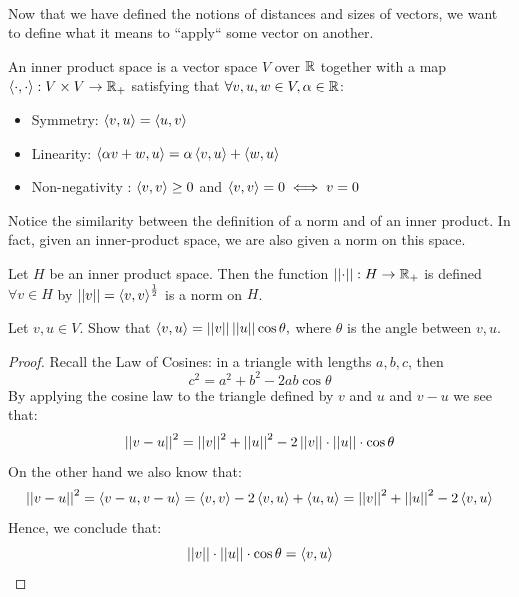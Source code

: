 ~\\
Now that we have defined the notions of distances and sizes of vectors, we want to define what it means to ``apply`` some vector on another.

\begin{definition} 
An inner product space is a vector space $V$ over $\mathbb{R}$ together with a map $\left\langle \cdot,\cdot\right\rangle:V\times V\rightarrow\mathbb{R}_+$ satisfying that $\forall v,u,w\in V, \alpha \in\mathbb{R}$:
\begin{itemize}
	\item Symmetry: $\left\langle v,u\right\rangle=\left\langle u,v\right\rangle$
	\item Linearity: $\left\langle \alpha v+w,u\right\rangle=\alpha \left\langle v,u\right\rangle + \left\langle w,u\right\rangle$
	\item Non-negativity : $\left\langle v,v\right\rangle\geq 0$  and $\left\langle v,v\right\rangle=0 \iff v=0$ 
\end{itemize}
\end{definition}

Notice the similarity between the definition of a norm and of an inner product. In fact, given an inner-product space, we are also given a norm on this space.

\begin{claim} Let $H$ be an inner product space. Then the function $\left|\left| \cdot\right|\right|:H\rightarrow \mathbb{R}_+$ is defined $\forall v\in H$ by $\left|\left| v\right|\right|=\left\langle v,v\right\rangle^{\frac{1}{2}}$ is a norm on $H$.
\end{claim}


\begin{exercise} 
Let $v,u\in V$. Show that  $\left\langle v,u\right\rangle=\left|\left| v\right|\right|\left|\left| u\right|\right|\cos\theta,$ where $\theta$ is the angle between $v,u$.
\end{exercise} 
\begin{proof}
Recall the Law of Cosines:  in a triangle with lengths $a,b,c$, then  $$c^2=a^2+b^2-2ab\cos\theta$$
By applying the cosine law to the triangle defined by $v$ and $u$ and $v-u$ we see that:
$$ \left|\left| v-u\right|\right|^2=\left|\left| v\right|\right|^2+\left|\left| u\right|\right|^2-2\left|\left| v\right|\right|\cdot\left|\left| u\right|\right|\cdot \cos \theta$$
On the other hand we also know that:
$$ \left|\left| v-u\right|\right|^2=\left\langle v-u,v-u\right\rangle=\left\langle v,v\right\rangle-2\left\langle v,u\right\rangle+\left\langle u,u\right\rangle= \left|\left| v\right|\right|^2+\left|\left| u\right|\right|^2-2\left\langle v,u\right\rangle$$
Hence, we conclude that: $$\left|\left| v\right|\right|\cdot\left|\left| u\right|\right|\cdot \cos \theta = \left\langle v,u\right\rangle$$
\end{proof}


